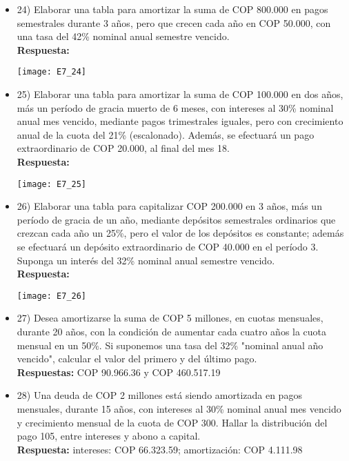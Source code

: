 \begin{itemize}
 \item 24)	 Elaborar una tabla para amortizar la suma de COP 800.000 en pagos semestrales durante 3 años, pero que crecen cada año en COP 50.000, con una tasa del 42\% nominal anual semestre vencido.\\
       \textbf{Respuesta:}
       \begin{center}
        \texttt{[image: E7\_24]}
       \end{center}
       \medskip

 \item 25)	 Elaborar una tabla para amortizar la suma de COP 100.000 en dos años, más un período de gracia muerto de 6 meses, con intereses al 30\% nominal anual mes vencido, mediante pagos trimestrales iguales, pero con crecimiento anual de la cuota del 21\% (escalonado). Además, se efectuará un pago extraordinario de COP 20.000, al final del mes 18.\\
       \textbf{Respuesta:}
       \begin{center}
        \texttt{[image: E7\_25]}
       \end{center}
       \medskip

 \item 26)	 Elaborar una tabla para capitalizar COP 200.000 en 3 años, más un período de gracia de un año, mediante depósitos semestrales ordinarios que crezcan cada año un 25\%, pero el valor de los depósitos es constante; además se efectuará un depósito extraordinario de COP 40.000 en el período 3. Suponga un interés del 32\% nominal anual semestre vencido.\\
       \textbf{Respuesta:}
       \begin{center}
        \texttt{[image: E7\_26]}
       \end{center}
       \medskip

 \item 27)	 Desea amortizarse la suma de COP 5 millones, en cuotas mensuales, durante 20 años, con la condición de aumentar cada cuatro años la cuota mensual en un 50\%. Si suponemos una tasa del 32\% "nominal anual año vencido", calcular el valor del primero y del último pago. \\
       \textbf{Respuestas:} COP 90.966.36 y COP 460.517.19
       \medskip

 \item 28)	 Una deuda de COP 2 millones está siendo amortizada en pagos mensuales, durante 15 años, con intereses al 30\% nominal anual mes vencido y crecimiento mensual de la cuota de COP 300. Hallar la distribución del pago 105, entre intereses y abono a capital.\\
       \textbf{Respuesta:} intereses: COP 66.323.59; amortización: COP 4.111.98
       \medskip


\end{itemize}
